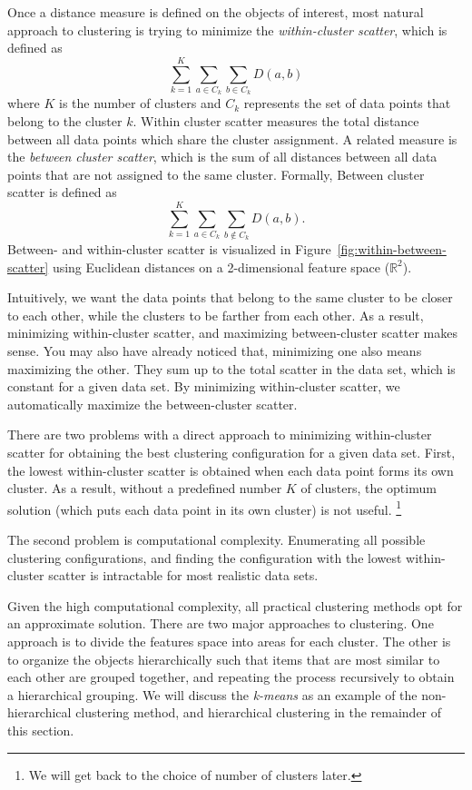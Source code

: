Once a distance measure is defined on the objects of interest,
most natural approach to clustering is trying to minimize
the \emph{within-cluster scatter}, which is defined as
\[
  \sum_{k=1}^{K} \sum_{a \in C_{k}} \sum_{b \in C_{k}} D(a, b)
\]
where $K$ is the number of clusters and
$C_{k}$ represents the set of data points that belong to the cluster $k$.
Within cluster scatter measures the total distance between all
data points which share the cluster assignment.
A related measure is the \emph{between cluster scatter},
which is the sum of all distances between all data points
that are not assigned to the same cluster.
Formally, Between cluster scatter is defined as 
\[
  \sum_{k=1}^{K} \sum_{a \in C_{k}} \sum_{b \not\in C_{k}} D(a, b) .
\]
Between- and within-cluster scatter is visualized
in Figure~\ref{fig:within-between-scatter}
using Euclidean distances on a 2-dimensional feature space ($\mathbb{R}^{2}$).

Intuitively,
we want the data points that belong to the same cluster
to be closer to each other,
while the clusters to be farther from each other.
As a result, minimizing within-cluster scatter,
and maximizing between-cluster scatter makes sense.
You may also have already noticed that,
minimizing one also means maximizing the other.
They sum up to the total scatter in the data set,
which is constant for a given data set.
By minimizing within-cluster scatter,
we automatically maximize the between-cluster scatter.

There are two problems with a direct approach
to minimizing within-cluster scatter
for obtaining the best clustering configuration for a given data set.
First, the lowest within-cluster scatter is obtained
when each data point forms its own cluster.
As a result, without a predefined number $K$ of clusters,
the optimum solution (which puts each data point in its own cluster)
is not useful.%
\footnote{We will get back to the choice of number of clusters later.}

The second problem is computational complexity.
Enumerating all possible clustering configurations,
and finding the configuration
with the lowest within-cluster scatter is intractable
for most realistic data sets.

Given the high computational complexity,
all practical clustering methods opt for an approximate solution.
There are two major approaches to clustering.
One approach is to divide the features space into areas for each cluster.
The other is to organize the objects hierarchically
such that items that are most similar to each other are grouped together,
and repeating the process recursively to obtain a hierarchical grouping.
We will discuss the \emph{k-means} as an example of the 
non-hierarchical clustering method,
and hierarchical clustering in the remainder of this section.


